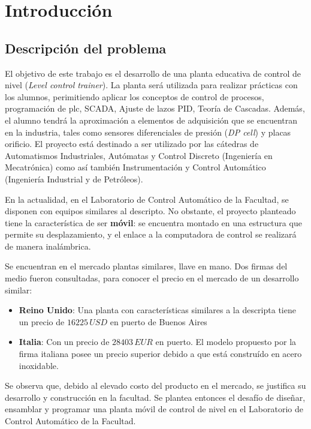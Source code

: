 \chapter{Introducción}
\label{ch:intro}

\section{Descripción del problema}
\label{sec:DescripcionProblema}
El objetivo de este trabajo es el desarrollo de una planta 
educativa de control de nivel
(\textit{Level control trainer}).
La planta será utilizada para realizar prácticas con los
alumnos, perimitiendo aplicar los conceptos de 
control de procesos, programación de \gls{plc}, SCADA,
Ajuste de lazos PID, Teoría de Cascadas. 
Además, el alumno tendrá la aproximación a elementos de adquisición que 
se encuentran en la industria, tales como sensores diferenciales de presión
(\textit{DP cell}) y placas orificio.
El proyecto está destinado a ser utilizado por las cátedras de
Automatismos Industriales, Autómatas y Control Discreto 
(Ingeniería en Mecatrónica)
como así también Instrumentación y Control Automático (Ingeniería Industrial
y de Petróleos).

En la actualidad, en el Laboratorio de Control Automático de la Facultad, 
se disponen con equipos similares al descripto.
No obstante, el proyecto planteado tiene la característica de ser 
\textbf{móvil}: se encuentra montado en una estructura que 
permite su desplazamiento, y el enlace a la 
computadora de control se realizará de manera inalámbrica.

Se encuentran en el mercado plantas similares, llave en mano. 
Dos firmas del medio fueron consultadas, para conocer 
el precio en el mercado de un desarrollo similar:
\begin{itemize}
 \item \textbf{Reino Unido}: Una planta con características similares
 a la descripta tiene un precio de $16225\,USD$ en puerto de Buenos Aires
 \item \textbf{Italia}: Con un precio de $28403\,EUR$ en puerto. 
 El modelo propuesto por la firma italiana
 posee un precio superior debido a que está construído en acero inoxidable.
\end{itemize}

Se observa que, debido al elevado costo del producto en el mercado,
se justifica su desarrollo  y construcción en la facultad.
Se plantea entonces el desafío de diseñar, ensamblar y programar una planta
móvil de control de nivel en el Laboratorio de Control Automático de la Facultad.

